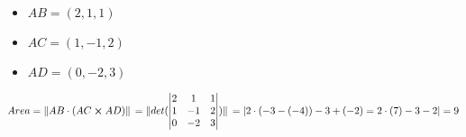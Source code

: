 \documentclass[../practica_01.tex]{subfiles}
\begin{document}
    \begin{itemize}
        \item $AB = (2,1,1) $
        \item $AC = (1,-1,2) $
        \item $AD = (0,-2,3) $
    \end{itemize}

    $ Area = \norm*{AB \cdot (AC \crossproduct AD)} = \norm*{det(\begin{vmatrix}
        2 & 1 & 1 \\
        1 & -1 & 2 \\
        0 & -2 & 3
    \end{vmatrix})} = |2\cdot(-3-(-4)) - 3 + (-2) = 2\cdot(7) -3 -2| = 9 $
\end{document}
